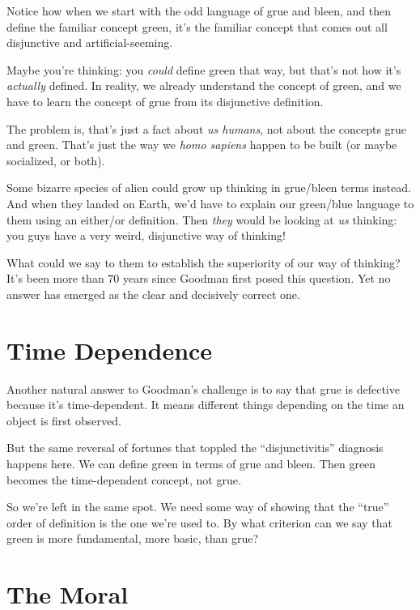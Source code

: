 \documentclass[justified]{tufte-book}
\theoremstyle{definition}
\theoremstyle{definition}
\theoremstyle{definition}
\theoremstyle{definition}
\theoremstyle{remark}
\begin{document}
Notice how when we start with the odd language of grue and bleen, and then define the familiar concept green, it's the familiar concept that comes out all disjunctive and artificial-seeming.

Maybe you're thinking: you \emph{could} define green that way, but that's not how it's \emph{actually} defined. In reality, we already understand the concept of green, and we have to learn the concept of grue from its disjunctive definition.

The problem is, that's just a fact about \emph{us humans}, not about the concepts grue and green. That's just the way we \emph{homo sapiens} happen to be built (or maybe socialized, or both).

Some bizarre species of alien could grow up thinking in grue/bleen terms instead. And when they landed on Earth, we'd have to explain our green/blue language to them using an either/or definition. Then \emph{they} would be looking at \emph{us} thinking: you guys have a very weird, disjunctive way of thinking!

What could we say to them to establish the superiority of our way of thinking? It's been more than \(70\) years since Goodman first posed this question. Yet no answer has emerged as the clear and decisively correct one.

\hypertarget{time-dependence}{%
\section*{Time Dependence}\label{time-dependence}}

Another natural answer to Goodman's challenge is to say that grue is defective because it's time-dependent. It means different things depending on the time an object is first observed.

But the same reversal of fortunes that toppled the ``disjunctivitis'' diagnosis happens here. We can define green in terms of grue and bleen. Then green becomes the time-dependent concept, not grue.

So we're left in the same spot. We need some way of showing that the ``true'' order of definition is the one we're used to. By what criterion can we say that green is more fundamental, more basic, than grue?

\hypertarget{the-moral}{%
\section*{The Moral}\label{the-moral}}
\end{document}
